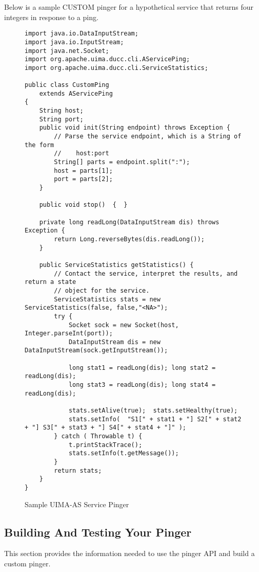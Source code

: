       Below is a sample CUSTOM pinger for a hypothetical service that returns four integers in
      response to a ping.
      \begin{figure}[H]
\begin{verbatim}
import java.io.DataInputStream;
import java.io.InputStream;
import java.net.Socket;
import org.apache.uima.ducc.cli.AServicePing;
import org.apache.uima.ducc.cli.ServiceStatistics;

public class CustomPing
    extends AServicePing
{
    String host;
    String port;
    public void init(String endpoint) throws Exception {
        // Parse the service endpoint, which is a String of the form 
        //    host:port
        String[] parts = endpoint.split(":");
        host = parts[1];
        port = parts[2];
    }

    public void stop()  {  }

    private long readLong(DataInputStream dis) throws Exception {
        return Long.reverseBytes(dis.readLong());
    }

    public ServiceStatistics getStatistics() {
        // Contact the service, interpret the results, and return a state
        // object for the service.
        ServiceStatistics stats = new ServiceStatistics(false, false,"<NA>");
        try {
            Socket sock = new Socket(host, Integer.parseInt(port));
            DataInputStream dis = new DataInputStream(sock.getInputStream());

            long stat1 = readLong(dis); long stat2 = readLong(dis); 
            long stat3 = readLong(dis); long stat4 = readLong(dis);

            stats.setAlive(true);  stats.setHealthy(true);
            stats.setInfo(  "S1[" + stat1 + "] S2[" + stat2 + "] S3[" + stat3 + "] S4[" + stat4 + "]" );
        } catch ( Throwable t) {
        	t.printStackTrace();
            stats.setInfo(t.getMessage());
        }
        return stats;        
    }
}
\end{verbatim}
        \caption{Sample UIMA-AS Service Pinger}
        \label{fig:service.custom.pinger}

      \end{figure}
      
      \subsection{Building And Testing Your Pinger}
      This section provides the information needed to use the pinger API and build a
      custom pinger. 

